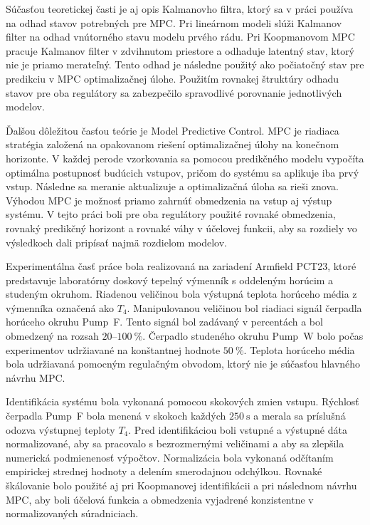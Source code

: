 Súčasťou teoretickej časti je aj opis Kalmanovho filtra, ktorý sa v práci používa na odhad stavov potrebných pre MPC. Pri lineárnom modeli slúži Kalmanov filter na odhad vnútorného stavu modelu prvého rádu. Pri Koopmanovom MPC pracuje Kalmanov filter v zdvihnutom priestore a odhaduje latentný stav, ktorý nie je priamo merateľný. Tento odhad je následne použitý ako počiatočný stav pre predikciu v MPC optimalizačnej úlohe. Použitím rovnakej štruktúry odhadu stavov pre oba regulátory sa zabezpečilo spravodlivé porovnanie jednotlivých modelov.

Ďalšou dôležitou časťou teórie je Model Predictive Control. MPC je riadiaca stratégia založená na opakovanom riešení optimalizačnej úlohy na konečnom horizonte. V každej perode vzorkovania sa pomocou predikčného modelu vypočíta optimálna postupnosť budúcich vstupov, pričom do systému sa aplikuje iba prvý vstup. Následne sa meranie aktualizuje a optimalizačná úloha sa rieši znova. Výhodou MPC je možnosť priamo zahrnúť obmedzenia na vstup aj výstup systému. V tejto práci boli pre oba regulátory použité rovnaké obmedzenia, rovnaký predikčný horizont a rovnaké váhy v účelovej funkcii, aby sa rozdiely vo výsledkoch dali pripísať najmä rozdielom modelov.

Experimentálna časť práce bola realizovaná na zariadení Armfield PCT23, ktoré predstavuje laboratórny doskový tepelný výmenník s oddeleným horúcim a studeným okruhom. Riadenou veličinou bola výstupná teplota horúceho média z výmenníka označená ako $T_4$. Manipulovanou veličinou bol riadiaci signál čerpadla horúceho okruhu Pump~F. Tento signál bol zadávaný v percentách a bol obmedzený na rozsah $20$--$100~\%$. Čerpadlo studeného okruhu Pump~W bolo počas experimentov udržiavané na konštantnej hodnote $50~\%$. Teplota horúceho média bola udržiavaná pomocným regulačným obvodom, ktorý nie je súčasťou hlavného návrhu MPC.

Identifikácia systému bola vykonaná pomocou skokových zmien vstupu. Rýchlosť čerpadla Pump~F bola menená v skokoch každých $250~\mathrm{s}$ a merala sa príslušná odozva výstupnej teploty $T_4$. Pred identifikáciou boli vstupné a výstupné dáta normalizované, aby sa pracovalo s bezrozmernými veličinami a aby sa zlepšila numerická podmienenosť výpočtov. Normalizácia bola vykonaná odčítaním empirickej strednej hodnoty a delením smerodajnou odchýlkou. Rovnaké škálovanie bolo použité aj pri Koopmanovej identifikácii a pri následnom návrhu MPC, aby boli účelová funkcia a obmedzenia vyjadrené konzistentne v normalizovaných súradniciach.

